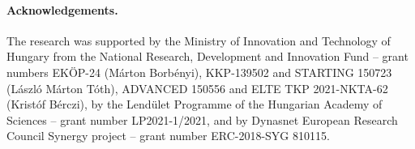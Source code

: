 \documentclass[10pt]{article}
\theoremstyle{plain}
\theoremstyle{definition}
\begin{document}
\paragraph{Acknowledgements.} The research was supported by the Ministry of Innovation and Technology of Hungary from the National Research, Development and Innovation Fund -- grant numbers EKÖP-24 (Márton Borbényi), KKP-139502 and STARTING 150723 (László Márton Tóth), ADVANCED 150556 and ELTE TKP 2021-NKTA-62 (Kristóf Bérczi), by the Lend\"ulet Programme of the Hungarian Academy of Sciences -- grant number LP2021-1/2021, and by Dynasnet European Research Council Synergy project -- grant number ERC-2018-SYG 810115.



\end{document}
